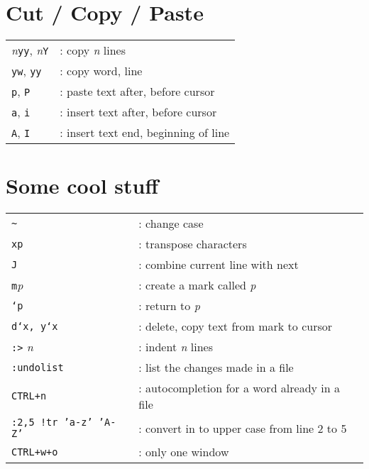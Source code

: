 \documentclass{article}
\begin{document}
\section{Cut / Copy / Paste}
\begin{tabular}{l l}
\textsl{n}\texttt{yy},  \textsl{n}\texttt{Y}	&			: copy \textsl{n} lines\\
\texttt{yw}, \texttt{yy}	&								: copy word, line\\
\texttt{p}, \texttt{P}		&							: paste text after, before cursor\\
\texttt{a}, \texttt{i}		&							: insert text after, before cursor\\
\texttt{A}, \texttt{I}		&							: insert text end, beginning of line\\
\end{tabular}
\section{Some cool stuff}
\begin{tabular}{l l}
\texttt{\~}		& 		: change case\\
\texttt{xp}		& 		: transpose characters\\
\texttt{J}		&		: combine current line with next\\
\texttt{m}\textsl{p}	&		: create a mark called \textsl{p}\\	
\texttt{`p}		& 	: return to \textsl{p}\\
\texttt{d`x, y`x}		& 			: delete, copy text from mark to cursor\\
\texttt{:>} \textsl{n}		&		: indent \textsl{n} lines\\
\texttt{:undolist} & : list the changes made in a file\\
\texttt{CTRL+n} & : autocompletion for a word already in a file\\
\texttt{:2,5 !tr 'a-z' 'A-Z'} & : convert in to upper case from line 2 to 5\\
\texttt{CTRL+w+o} & : only one window\\
\end{tabular}
\end{document}
